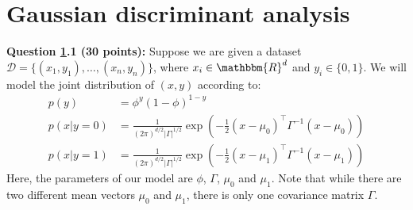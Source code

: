 \documentclass[12pt]{article}
\begin{document}
\section{Gaussian discriminant analysis}
\label{sec:gda}

\textbf{Question \ref{sec:gda}.1 (30 points):} Suppose we are given a dataset $\mathcal{D}=\{(x_1,y_1),\ldots,(x_n,y_n)\}$, where $x_i\in\mathbbm{R}^d$ and $y_i\in\{0,1\}$. We will model the joint distribution of $(x,y)$ according to:
\begin{align*}
    p(y)&=\phi^y(1-\phi)^{1-y}\\
    p(x|y=0)&=\frac{1}{(2\pi)^{d/2}|\Gamma|^{1/2}}\exp\left(-\frac{1}{2}(x-\mu_0)^\top\Gamma^{-1}(x-\mu_0)\right)\\
    p(x|y=1)&=\frac{1}{(2\pi)^{d/2}|\Gamma|^{1/2}}\exp\left(-\frac{1}{2}(x-\mu_1)^\top\Gamma^{-1}(x-\mu_1)\right)
\end{align*}
Here, the parameters of our model are $\phi$, $\Gamma$, $\mu_0$ and $\mu_1$. Note that while there are two different mean vectors $\mu_0$ and $\mu_1$, there is only one covariance matrix $\Gamma$.
\end{document}
